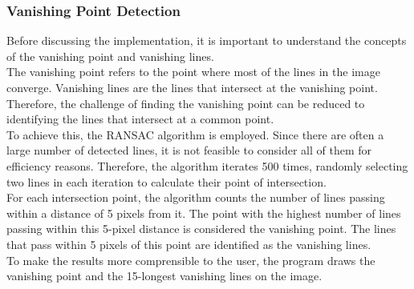 \begin{multicols}{2}
\subsubsection{Vanishing Point Detection}
\label{subsubsec:vanishing-point-detection}

Before discussing the implementation, it is important to understand the concepts of the vanishing point and vanishing lines. \\
The vanishing point refers to the point where most of the lines in the image converge. Vanishing lines are the lines that intersect at the vanishing point.
Therefore, the challenge of finding the vanishing point can be reduced to identifying the lines that intersect at a common point.\\
To achieve this, the RANSAC algorithm is employed. Since there are often a large number of detected lines,
it is not feasible to consider all of them for efficiency reasons.
Therefore, the algorithm iterates 500 times, randomly selecting two lines in each iteration to calculate their point of intersection.\\
For each intersection point, the algorithm counts the number of lines passing within a distance of 5 pixels from it.
The point with the highest number of lines passing within this 5-pixel distance is considered the vanishing point.
The lines that pass within 5 pixels of this point are identified as the vanishing lines.\\
To make the results more comprensible to the user, the program draws the vanishing point and the 15-longest vanishing lines on the image.

\end{multicols}
